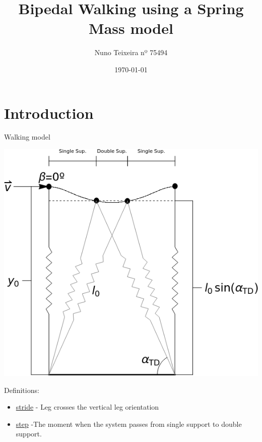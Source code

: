 \documentclass{beamer}
\title[TAFC]{Bipedal Walking using a Spring Mass model}
\author[Nuno Teixeira]{Nuno Teixeira nº 75494}
\institute{Instituto Superior Técnico}
\date{\today}
\begin{document}
\begin{frame}
  \titlepage
\end{frame}

\section{Introduction}
\begin{frame}{Walking model}
  \begin{center}
  \includegraphics[height=0.5\textheight]{Seyfarth2006_trimmed.png}
  \end{center}
Definitions:
  \begin{itemize}
\item  \underline{stride} - Leg crosses the vertical leg orientation
\item  \underline{step} -The moment when the system passes from single support to double support.
  \end{itemize}
\end{frame}
\end{document}
